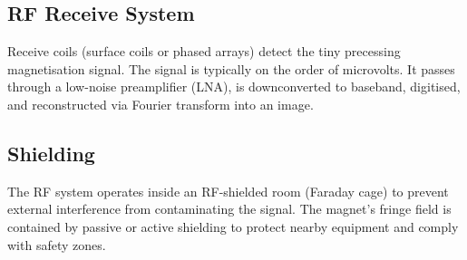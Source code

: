 				

\subsection{RF Receive System}

				


				

Receive coils (surface coils or phased arrays) detect the tiny precessing magnetisation signal. The signal is typically on the order of microvolts. It passes through a low-noise preamplifier (LNA), is downconverted to baseband, digitised, and reconstructed via Fourier transform into an image.

				

\subsection{Shielding}

				

The RF system operates inside an RF-shielded room (Faraday cage) to prevent external interference from contaminating the signal. The magnet's fringe field is contained by passive or active shielding to protect nearby equipment and comply with safety zones.



